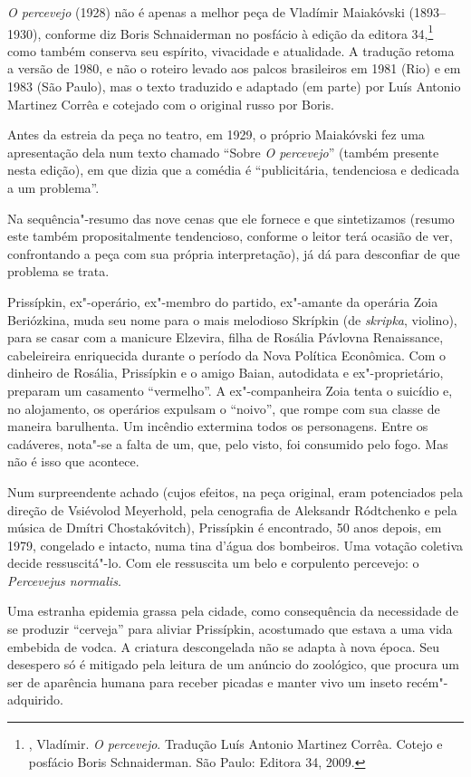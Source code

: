 \emph{O percevejo} (1928) não é apenas a melhor peça de Vladímir
Maiakóvski (1893--1930), conforme diz Boris Schnaiderman no posfácio à
edição da editora 34,\footnote{, Vladímir. \emph{O percevejo}.
  Tradução Luís Antonio Martinez Corrêa. Cotejo e posfácio Boris
  Schnaiderman. São Paulo: Editora 34, 2009.} como também conserva seu
espírito, vivacidade e atualidade. A tradução retoma a versão de 1980, e
não o roteiro levado aos palcos brasileiros em 1981 (Rio) e em 1983 (São
Paulo), mas o texto traduzido e adaptado (em parte) por Luís Antonio
Martinez Corrêa e cotejado com o original russo por Boris.

Antes da estreia da peça no teatro, em 1929, o próprio Maiakóvski fez
uma apresentação dela num texto chamado ``Sobre \emph{O percevejo}''
(também presente nesta edição), em que dizia que a comédia é
``publicitária, tendenciosa e dedicada a um problema''.

Na sequência"-resumo das nove cenas que ele fornece e que sintetizamos
(resumo este também propositalmente tendencioso, conforme o leitor terá
ocasião de ver, confrontando a peça com sua própria interpretação), já
dá para desconfiar de que problema se trata.

Prissípkin, ex"-operário, ex"-membro do partido, ex"-amante da operária
Zoia Beriózkina, muda seu nome para o mais melodioso Skrípkin (de
\emph{skripka}, violino), para se casar com a manicure Elzevira, filha
de Rosália Pávlovna Renaissance, cabeleireira enriquecida durante o
período da Nova Política Econômica. Com o dinheiro de Rosália,
Prissípkin e o amigo Baian, autodidata e ex"-proprietário, preparam um
casamento ``vermelho''. A ex"-companheira Zoia tenta o suicídio e, no
alojamento, os operários expulsam o ``noivo'', que rompe com sua classe de
maneira barulhenta. Um incêndio extermina todos os personagens. Entre os
cadáveres, nota"-se a falta de um, que, pelo visto, foi consumido pelo
fogo. Mas não é isso que acontece.

Num surpreendente achado (cujos efeitos, na peça original, eram
potenciados pela direção de Vsiévolod Meyerhold, pela cenografia de
Aleksandr Ródtchenko e pela música de Dmítri Chostakóvitch), Prissípkin
é encontrado, 50 anos depois, em 1979, congelado e intacto, numa tina
d'água dos bombeiros. Uma votação coletiva decide ressuscitá"-lo. Com ele
ressuscita um belo e corpulento percevejo: o \emph{Percevejus normalis}.

Uma estranha epidemia grassa pela cidade, como consequência da
necessidade de se produzir ``cerveja'' para aliviar Prissípkin, acostumado
que estava a uma vida embebida de vodca. A criatura descongelada não se
adapta à nova época. Seu desespero só é mitigado pela leitura de um
anúncio do zoológico, que procura um ser de aparência humana para
receber picadas e manter vivo um inseto recém"-adquirido.

